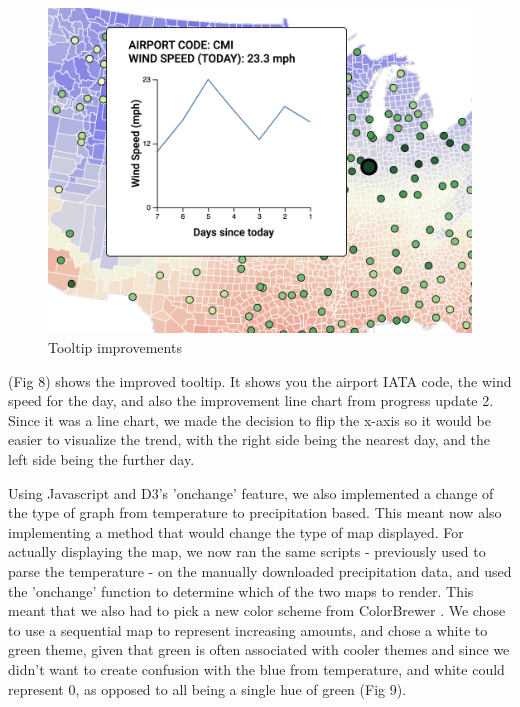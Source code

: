 \documentclass[10pt,twocolumn,twoside]{opticajnl}
\begin{document}
\begin{figure}
    \centering
    \includegraphics[scale=0.4]{images/img6.png}
    \caption{Tooltip improvements}
\end{figure}

(Fig 8) shows the improved tooltip. It shows you the airport IATA code, the wind speed for the day, and also the improvement line chart from progress update 2. Since it was a line chart, we made the decision to flip the x-axis so it would be easier to visualize the trend, with the right side being the nearest day, and the left side being the further day.

Using Javascript and D3's 'onchange' feature, we also implemented a change of the type of graph from temperature to precipitation based. This meant now also implementing a method that would change the type of map displayed. For actually displaying the map, we now ran the same scripts - previously used to parse the temperature - on the manually downloaded precipitation data, and used the 'onchange' function to determine which of the two maps to render. This meant that we also had to pick a new color scheme from ColorBrewer \cite{colorbrewer}. We chose to use a sequential map to represent increasing amounts, and chose a white to green theme, given that green is often associated with cooler themes and since we didn't want to create confusion with the blue from temperature, and white could represent 0, as opposed to all being a single hue of green (Fig 9). 
\end{document}
